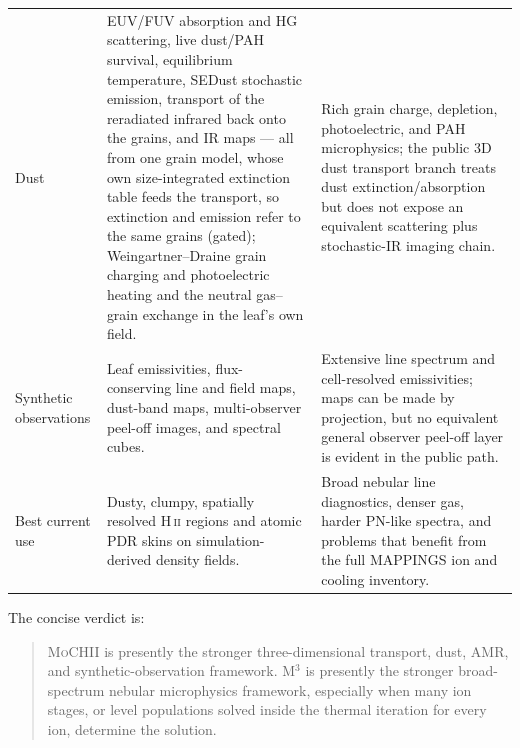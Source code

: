 \documentclass[english,a4paper]{my_memo}
\newcommand{\MoCHII}{\textsc{MoCHII}}
\newcommand{\Mthree}{M$^3$}
\begin{document}
\begin{longtable}{P{0.19\textwidth}P{0.35\textwidth}P{0.35\textwidth}}
Dust & EUV/FUV absorption and HG scattering, live dust/PAH survival,
equilibrium temperature, SEDust stochastic emission, transport of the
reradiated infrared back onto the grains, and IR maps --- all from one
grain model, whose own size-integrated extinction table feeds the
transport, so extinction and emission refer to the same grains (gated);
Weingartner--Draine grain charging and photoelectric heating and the
neutral gas--grain exchange in the leaf's own field. & Rich
grain charge, depletion, photoelectric, and PAH microphysics; the public 3D
dust transport branch treats dust extinction/absorption but does not expose
an equivalent scattering plus stochastic-IR imaging chain. \\

Synthetic observations & Leaf emissivities, flux-conserving line and field
maps, dust-band maps, multi-observer peel-off images, and spectral cubes. &
Extensive line spectrum and cell-resolved emissivities; maps can be made by
projection, but no equivalent general observer peel-off layer is evident in
the public path. \\

Best current use & Dusty, clumpy, spatially resolved H\,\textsc{ii}
regions and atomic PDR skins on simulation-derived density fields. & Broad
nebular line diagnostics, denser gas, harder PN-like spectra, and problems
that benefit from the full MAPPINGS ion and cooling inventory. \\
\end{longtable}

The concise verdict is:

\begin{quote}
\MoCHII{} is presently the stronger three-dimensional transport, dust, AMR,
and synthetic-observation framework.  \Mthree{} is presently the stronger
broad-spectrum nebular microphysics framework, especially when many ion
stages, or level populations solved inside the thermal iteration for every
ion, determine the solution.
\end{quote}
\end{document}
